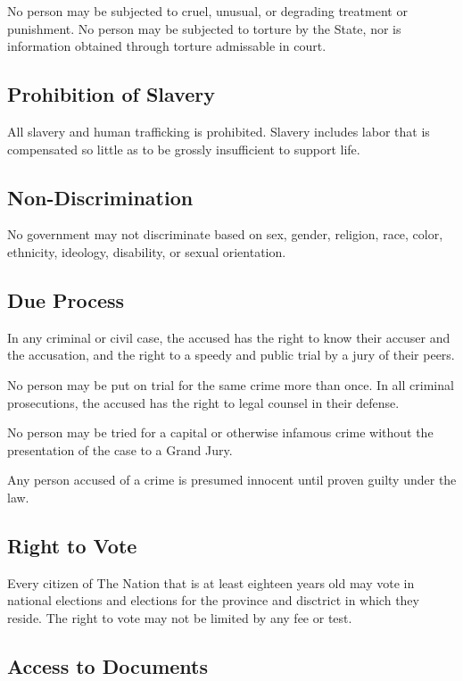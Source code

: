 \documentclass{report}
\newcommand{\nation}{The Nation}
\begin{document}
    No person may be subjected to cruel, unusual, or degrading treatment or
    punishment. No person may be subjected to torture by the State, nor is
    information obtained through torture admissable in court.

    \subsection{Prohibition of Slavery}

    All slavery and human trafficking is prohibited. Slavery includes labor
    that is compensated so little as to be grossly insufficient to support
    life.

    \subsection{Non-Discrimination}

    No government may not discriminate based on sex, gender, religion, race, color,
    ethnicity, ideology, disability, or sexual orientation.

    \subsection{Due Process}

    In any criminal or civil case, the accused has the right to know their
    accuser and the accusation, and the right to a speedy and public trial by
    a jury of their peers.

    No person may be put on trial for the same crime more than once. In all
    criminal prosecutions, the accused has the right to legal counsel in their
    defense.

    No person may be tried for a capital or otherwise infamous crime without
    the presentation of the case to a Grand Jury.

    Any person accused of a crime is presumed innocent until proven guilty
    under the law.

    \subsection{Right to Vote}

    Every citizen of \nation{} that is at least eighteen years old may vote in
    national elections and elections for the province and disctrict in which
    they reside. The right to vote may not be limited by any fee or test.

    \subsection{Access to Documents}
\end{document}
